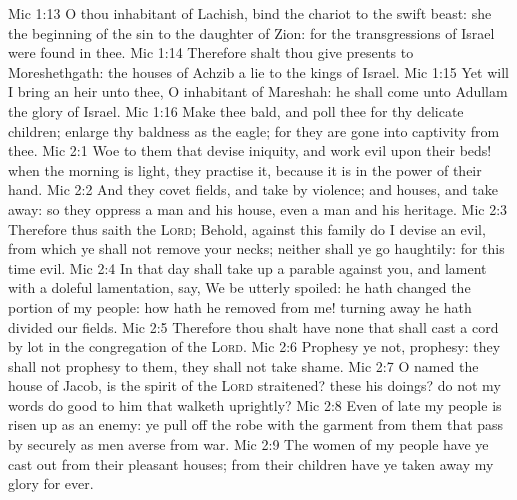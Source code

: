 \vs Mic 1:13 O thou inhabitant of Lachish, bind the chariot to the swift beast: she  the beginning of the sin to the daughter of Zion: for the transgressions of Israel were found in thee.
\vs Mic 1:14 Therefore shalt thou give presents to Moreshethgath: the houses of Achzib  a lie to the kings of Israel.
\vs Mic 1:15 Yet will I bring an heir unto thee, O inhabitant of Mareshah: he shall come unto Adullam the glory of Israel.
\vs Mic 1:16 Make thee bald, and poll thee for thy delicate children; enlarge thy baldness as the eagle; for they are gone into captivity from thee.
\vs Mic 2:1 Woe to them that devise iniquity, and work evil upon their beds! when the morning is light, they practise it, because it is in the power of their hand.
\vs Mic 2:2 And they covet fields, and take  by violence; and houses, and take  away: so they oppress a man and his house, even a man and his heritage.
\vs Mic 2:3 Therefore thus saith the \textsc{Lord}; Behold, against this family do I devise an evil, from which ye shall not remove your necks; neither shall ye go haughtily: for this time  evil.
\vs Mic 2:4 In that day shall  take up a parable against you, and lament with a doleful lamentation,  say, We be utterly spoiled: he hath changed the portion of my people: how hath he removed  from me! turning away he hath divided our fields.
\vs Mic 2:5 Therefore thou shalt have none that shall cast a cord by lot in the congregation of the \textsc{Lord}.
\vs Mic 2:6 Prophesy ye not,  prophesy: they shall not prophesy to them,  they shall not take shame.
\vs Mic 2:7 O  named the house of Jacob, is the spirit of the \textsc{Lord} straitened?  these his doings? do not my words do good to him that walketh uprightly?
\vs Mic 2:8 Even of late my people is risen up as an enemy: ye pull off the robe with the garment from them that pass by securely as men averse from war.
\vs Mic 2:9 The women of my people have ye cast out from their pleasant houses; from their children have ye taken away my glory for ever.
